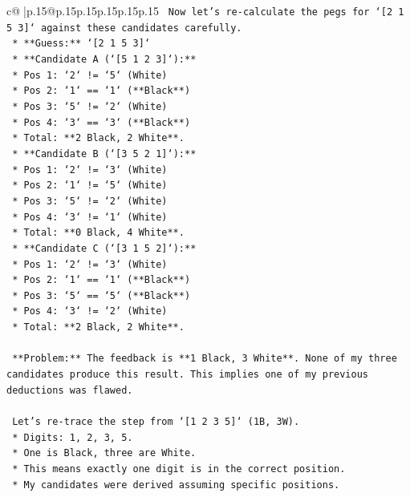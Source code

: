 \documentclass{article}
\begin{document}
{\begin{supertabular}{c@{$\;$}|p{.15\linewidth}@{}p{.15\linewidth}p{.15\linewidth}p{.15\linewidth}p{.15\linewidth}p{.15\linewidth}}
{{{\texttt{    Now let's re{-}calculate the pegs for `{[}2 1 5 3{]}` against these candidates carefully.} \\
\texttt{    *   **Guess:** `{[}2 1 5 3{]}`} \\
\texttt{    *   **Candidate A (`{[}5 1 2 3{]}`):**} \\
\texttt{        *   Pos 1: `2` != `5` (White)} \\
\texttt{        *   Pos 2: `1` == `1` (**Black**)} \\
\texttt{        *   Pos 3: `5` != `2` (White)} \\
\texttt{        *   Pos 4: `3` == `3` (**Black**)} \\
\texttt{        *   Total: **2 Black, 2 White**.} \\
\texttt{    *   **Candidate B (`{[}3 5 2 1{]}`):**} \\
\texttt{        *   Pos 1: `2` != `3` (White)} \\
\texttt{        *   Pos 2: `1` != `5` (White)} \\
\texttt{        *   Pos 3: `5` != `2` (White)} \\
\texttt{        *   Pos 4: `3` != `1` (White)} \\
\texttt{        *   Total: **0 Black, 4 White**.} \\
\texttt{    *   **Candidate C (`{[}3 1 5 2{]}`):**} \\
\texttt{        *   Pos 1: `2` != `3` (White)} \\
\texttt{        *   Pos 2: `1` == `1` (**Black**)} \\
\texttt{        *   Pos 3: `5` == `5` (**Black**)} \\
\texttt{        *   Pos 4: `3` != `2` (White)} \\
\texttt{        *   Total: **2 Black, 2 White**.} \\
\\ 
\texttt{    **Problem:** The feedback is **1 Black, 3 White**. None of my three candidates produce this result. This implies one of my previous deductions was flawed.} \\
\\ 
\texttt{    Let's re{-}trace the step from `{[}1 2 3 5{]}` (1B, 3W).} \\
\texttt{    *   Digits: 1, 2, 3, 5.} \\
\texttt{    *   One is Black, three are White.} \\
\texttt{    *   This means exactly one digit is in the correct position.} \\
\texttt{    *   My candidates were derived assuming specific positions.} \\
}}}
\end{supertabular}}
\end{document}
